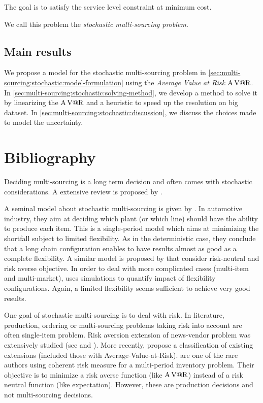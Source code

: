 The goal is to satisfy the service level constraint at minimum cost.


We call this problem the \emph{stochastic multi-sourcing problem}.


\subsection{Main results}
\label{sec:multi-sourcing:stochastic:introduction:main-results}


We propose a model for the stochastic multi-sourcing problem in \cref{sec:multi-sourcing:stochastic:model-formulation} using the \emph{Average Value at Risk $\operatorname{A\operatorname{V@R}}$}.
In \cref{sec:multi-sourcing:stochastic:solving-method}, we develop a method to solve it by linearizing the $\operatorname{A\operatorname{V@R}}$ and a heuristic to speed up the resolution on big dataset.
In \cref{sec:multi-sourcing:stochastic:discussion}, we discuss the choices made to model the uncertainty.



\section{Bibliography}
\label{sec:multi-sourcing:stochastic:bibliography}


Deciding multi-sourcing is a long term decision and often comes with stochastic considerations.
A extensive review is proposed by \citet{Yao2017}.


A seminal model about stochastic multi-sourcing is given by \citet{Jordan1995}.
In automotive industry, they aim at deciding which plant (or which line) should have the ability to produce each item.
This is a single-period model which aims at minimizing the shortfall subject to limited flexibility.
As in the deterministic case, they conclude that a long chain configuration enables to have results almost as good as a complete flexibility.
A similar model is proposed by \citet{Brian2005} that consider risk-neutral and risk averse objective.
In order to deal with more complicated cases (multi-item and multi-market), \citet{Garavelli2003} uses simulations to quantify impact of flexibility configurations.
Again, a limited flexibility seems sufficient to achieve very good results.


One goal of stochastic multi-sourcing is to deal with risk.
In literature, production, ordering or multi-sourcing problems taking risk into account are often single-item problem.
Risk aversion extension of news-vendor problem was extensively studied (see \citet{Vipul2000} and \citet{Choi2008}).
More recently, \citet{Arikan2017} propose a classification of existing extensions (included those with Average-Value-at-Risk).
\citet{Ahmed2007} are one of the rare authors using coherent risk measure for a multi-period inventory problem.
Their objective is to minimize a risk averse function (like $\operatorname{A\operatorname{V@R}}$) instead of a risk neutral function (like expectation).
However, these are production decisions and not multi-sourcing decisions.



